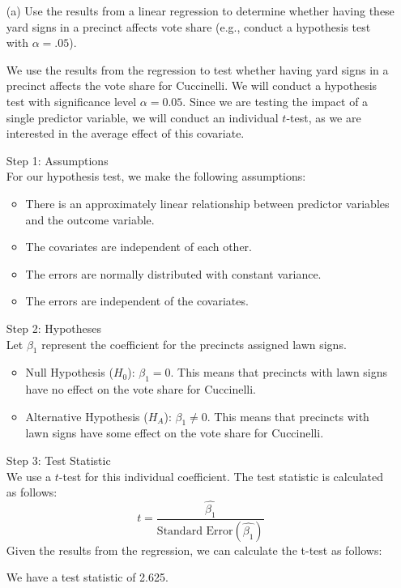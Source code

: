 \documentclass[12pt,letterpaper]{article}
\begin{document}
\vspace{.5cm}
\begin{enumerate}
	\item [(a)] Use the results from a linear regression to determine whether having these yard signs in a precinct affects vote share (e.g., conduct a hypothesis test with $\alpha = .05$).
	
	We use the results from the regression to test whether having yard signs in a precinct affects the vote share for Cuccinelli. We will conduct a hypothesis test with significance level \( \alpha = 0.05 \).
	Since we are testing the impact of a single predictor variable, we will conduct an individual \( t \)-test, as we are interested in the average effect of this covariate.
	
	
	Step 1: Assumptions \\
	For our hypothesis test, we make the following assumptions:
	\begin{itemize}
		\item There is an approximately linear relationship between predictor variables and the outcome variable.
		\item The covariates are independent of each other.
		\item The errors are normally distributed with constant variance.
		\item The errors are independent of the covariates.
	\end{itemize}
	
	Step 2: Hypotheses\\
	Let \( \beta_1 \) represent the coefficient for the precincts assigned lawn signs.
	\begin{itemize}
		\item Null Hypothesis (\( H_0 \)): \( \beta_1 = 0 \). This means that precincts with lawn signs have no effect on the vote share for Cuccinelli.
		\item Alternative Hypothesis (\( H_A \)): \( \beta_1 \neq 0 \). This means that precincts with lawn signs have some effect on the vote share for Cuccinelli.
	\end{itemize}
	
	Step 3: Test Statistic\\
	We use a \( t \)-test for this individual coefficient. The test statistic is calculated as follows:
	\[
	t = \frac{\hat{\beta_1}}{\text{Standard Error}(\hat{\beta_1})}
	\]
	Given the results from the regression, we can calculate the t-test as follows:
	
	We have a test statistic of 2.625.
	

\end{enumerate}
\end{document}
